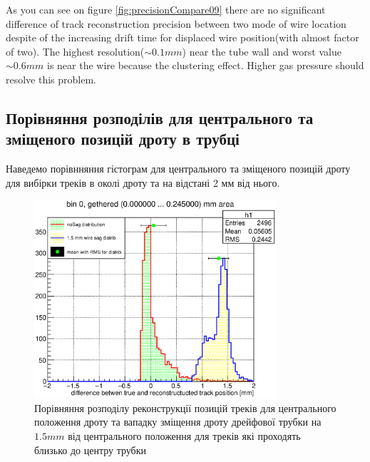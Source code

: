 \documentclass[]{article}
\begin{document}
	As you can see on figure \ref{fig:precisionCompare09} there are no significant difference of track reconstruction precision between two mode of wire location despite of the increasing drift time for displaced wire position(with almost factor of two).	 The highest resolution($\sim 0.1 mm$) near the tube wall and worst value $\sim0.6mm$ is near the wire because the clustering effect. Higher gas pressure should resolve this problem.
	
	\subsection{Порівняння розподілів для центрального та зміщеного позицій дроту в трубці}
	Наведемо порівнняння гістограм для центрального та зміщеного позицій дроту для вибірки треків в околі дроту та на відстані 2 мм від нього.
	
	\begin{figure}[h!]
	\includegraphics[width=0.8\textwidth]{bin0_0mm.eps}
	\centering
	\caption{ Порівняння розподілу реконструкції позицій треків для центрального положення дроту та вападку зміщення дроту дрейфової трубки на $1.5 mm$ від центрального положення для треків які проходять близько до центру трубки}
	\end{figure}
	
\end{document}
